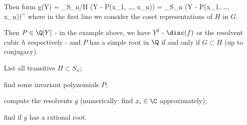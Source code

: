 Then form
\be
g(Y) = \prod_{\sigma \in S_n/H} (Y - \sigma P(x_1, \dots , x_n)) = \prod_{\sigma \in S_n} (Y - \sigma P(x_1, \dots , x_n))^{} 
\ee
where in the first line we consider the coset representations of $H$ in $G$.

Then $P \in \Q[Y]$ - in the example above, we have $Y^2$ - $\disc(f)$ or the resolvent cubic $h$ respectively - and $P$ has a simple root in $\Q$ if and only if $G \subset H$ (up to conjugacy).
\bit
\item List all transitive $H \subset S_n$;
\item find some invariant polynomials $P$;
\item compute the resolvents $g$ (numerically: find $x_i \in \C$ approximately);
\item find if $g$ has a rational root.
\eit


